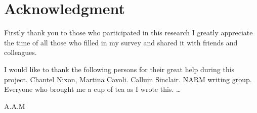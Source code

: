 \section*{Acknowledgment}
Firstly thank you to those who participated in this research I greatly appreciate the time of all those who filled in my survey and shared it with friends and colleagues.

I would like to thank the following persons for their great help during this project. Chantel Nixon, Martina Cavoli. Callum Sinclair. NARM writing group. Everyone who brought me a cup of tea as I wrote this. \ldots



\begin{flushright}
A.A.M\\[1pc]

\end{flushright}